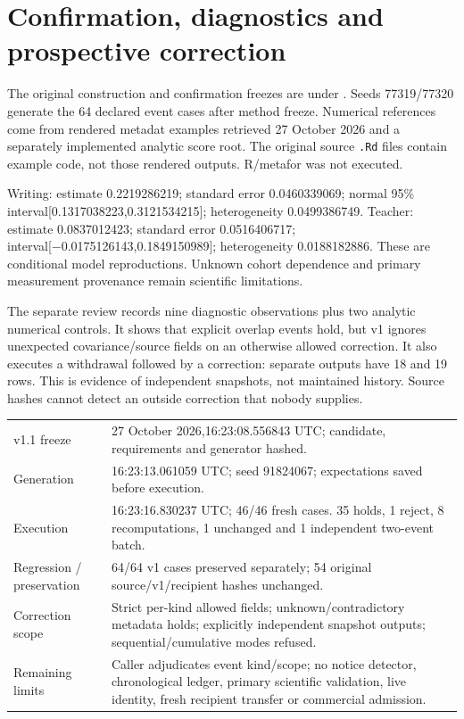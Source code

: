 \documentclass[10 pt]{article}
\begin{document}
\section{Confirmation, diagnostics and prospective correction}

The original construction and confirmation freezes are under . Seeds 77319/77320 generate the 64 declared event cases after method freeze. Numerical references come from rendered metadat examples retrieved 27 October 2026 and a separately implemented analytic score root. The original source \texttt{.Rd} files contain example code, not those rendered outputs. R/metafor was not executed.

Writing: estimate 0.2219286219; standard error 0.0460339069; normal 95\% interval[0.1317038223,0.3121534215]; heterogeneity 0.0499386749. Teacher: estimate 0.0837012423; standard error 0.0516406717; interval[−0.0175126143,0.1849150989]; heterogeneity 0.0188182886. These are conditional model reproductions. Unknown cohort dependence and primary measurement provenance remain scientific limitations.

The separate review records nine diagnostic observations plus two analytic numerical controls. It shows that explicit overlap events hold, but v1 ignores unexpected covariance/source fields on an otherwise allowed correction. It also executes a withdrawal followed by a correction: separate outputs have 18 and 19 rows. This is evidence of independent snapshots, not maintained history. Source hashes cannot detect an outside correction that nobody supplies.

\begin{tabularx}{\textwidth}{p{}Y}
\toprule
v1.1 freeze &27 October 2026,16:23:08.556843 UTC; candidate, requirements and generator hashed.\\
Generation &16:23:13.061059 UTC; seed 91824067; expectations saved before execution.\\
Execution &16:23:16.830237 UTC; 46/46 fresh cases. 35 holds, 1 reject, 8 recomputations, 1 unchanged and 1 independent two-event batch.\\
Regression / preservation &64/64 v1 cases preserved separately; 54 original source/v1/recipient hashes unchanged.\\
Correction scope &Strict per-kind allowed fields; unknown/contradictory metadata holds; explicitly independent snapshot outputs; sequential/cumulative modes refused.\\
Remaining limits &Caller adjudicates event kind/scope; no notice detector, chronological ledger, primary scientific validation, live identity, fresh recipient transfer or commercial admission.\\
\bottomrule
\end{tabularx}
\end{document}
